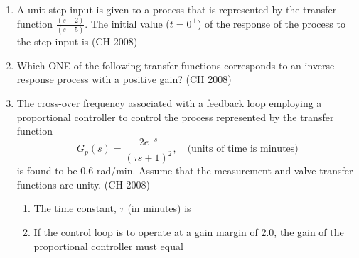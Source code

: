 \begin{enumerate}[label=\thesubsection.\arabic*,ref=\thesubsection.\theenumi]
\item A unit step input is given to a process that is represented by the transfer function $\frac{(s+2)}{(s+5)}$. The initial value ($t = 0^+$) of the response of the process to the step input is
\hfill{(CH 2008)}
\begin{enumerate}
\end{enumerate}
\item Which ONE of the following transfer functions corresponds to an inverse response process with a positive gain?
\hfill{(CH 2008)}
\begin{enumerate}
\end{enumerate}
\item The cross-over frequency associated with a feedback loop employing a proportional controller to control the process represented by the transfer function
\[G_p(s) = \frac{2 e^{-s}}{(\tau s + 1)^2}, \quad \text{(units of time is minutes)}\]
is found to be $0.6$ rad/min. Assume that the measurement and valve transfer functions are unity.
    \hfill{(CH 2008)}
    \begin{enumerate}
    \item The time constant, $\tau$ (in minutes) is
    \begin{enumerate}
    \end{enumerate}
    \item If the control loop is to operate at a gain margin of $2.0$, the gain of the proportional controller must equal

\end{enumerate}
\end{enumerate}
